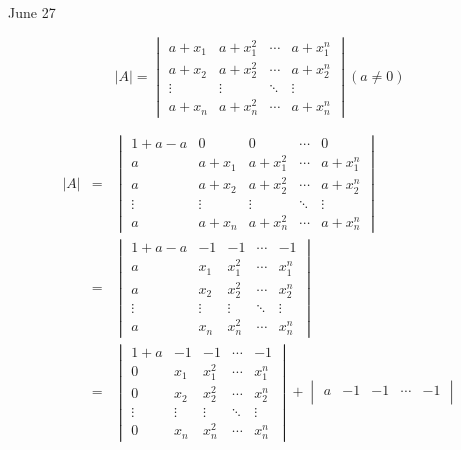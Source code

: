 \textcolor{purplea}{June 27}

\begin{example}[][Exam: 32.4.11]
	$$|A| = 
	\begin{vmatrix}
		a+x_{1} & a+x_{1}^{2} & \cdots & a+x_{1}^n \\
		a+x_{2} & a+x_{2}^{2} & \cdots & a+x_{2}^n \\
		\vdots  & \vdots      & \ddots & \vdots \\
		a+x_{n} & a+x_{n}^2   & \cdots & a+x_{n}^n
	\end{vmatrix}(a\neq 0)$$
\end{example}

\begin{solution}
	\begin{eqnarray*}
		|A| & = & 
		\begin{vmatrix}
			1+a-a  & 0       & 0         & \cdots & 0 \\
			a      & a+x_{1} & a+x_{1}^2 & \cdots & a+x_{1}^n\\
			a      & a+x_{2} & a+x_{2}^2 & \cdots & a+x_{2}^n\\
			\vdots & \vdots  & \vdots    & \ddots & \vdots\\
			a      & a+x_{n} & a+x_{n}^2 & \cdots & a+x_{n}^n
		\end{vmatrix}\\
		    & =& 
		\begin{vmatrix}
			1+a-a  & -1     & -1      & \cdots & -1 \\
			a      & x_{1}  & x_{1}^2 & \cdots & x_{1}^n \\
			a      & x_{2}  & x_{2}^2 & \cdots & x_{2}^n\\
			\vdots & \vdots & \vdots  & \ddots & \vdots\\
			a      & x_{n}  & x_{n}^2 & \cdots & x_{n}^n
		\end{vmatrix}\\
		    & = & 
		\begin{vmatrix}
			1+a    & -1     & -1      & \cdots & -1\\
			0      & x_{1}  & x_{1}^2 & \cdots & x_{1}^n\\
			0      & x_{2}  & x_{2}^2 & \cdots & x_{2}^n\\
			\vdots & \vdots & \vdots  & \ddots & \vdots\\
			0      & x_{n}  & x_{n}^2 & \cdots & x_{n}^n
		\end{vmatrix} + 
		\begin{vmatrix}
			a      & -1     & -1      & \cdots & -1 \\

\end{vmatrix}
\end{eqnarray*}
\end{solution}
